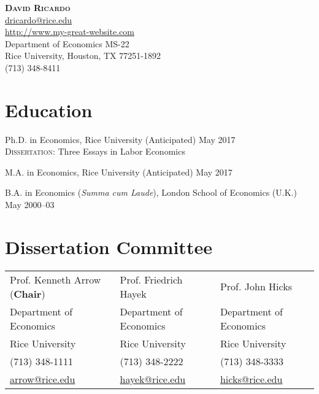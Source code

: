 \documentclass{article}[12]
\makeatletter
\newcommand{\forceindent}{\leavevmode{\parindent=24pt\indent}}
\newcommand{\email}[1]{\href{mailto:#1}{#1}}
\newcommand{\myname}{David Ricardo}
\newcommand{\myemail}{dricardo@rice.edu}
\newcommand{\mywebsite}{http://www.my-great-website.com}
\newcommand{\myphone}{(713) 348-8411}
\newcommand{\myaddress}{Department of Economics MS-22 \\ 
Rice University, Houston, TX 77251-1892}
\makeatother
\begin{document}
\thispagestyle{empty}

\begin{center}
{\bfseries\Large\scshape \myname} \\[4pt]
\email{\myemail} \\ \url{\mywebsite} \\ \myaddress \\ \myphone
\end{center}
 
\vspace{-0.5cm} 


\section{Education}

Ph.D. in Economics, Rice University  \hfill (Anticipated) May 2017  \\
\forceindent \textsc{Dissertation}: Three Essays in Labor Economics 

M.A. in Economics, Rice University  \hfill (Anticipated) May 2017 

B.A. in Economics (\emph{Summa cum Laude}), London School of Economics (U.K.)  \hfill    May 2000--03 


\section{Dissertation Committee}

\begin{tabularx}{\textwidth}{@{}XXX@{}}
Prof. Kenneth Arrow (\textbf{Chair}) & Prof. Friedrich Hayek   & Prof. John Hicks        \\
Department of Economics              & Department of Economics & Department of Economics \\
Rice University                      & Rice University         & Rice University         \\
(713) 348-1111                       & (713) 348-2222          & (713) 348-3333          \\
\email{arrow@rice.edu}               & \email{hayek@rice.edu}  & \email{hicks@rice.edu}
\end{tabularx}


\end{document}
